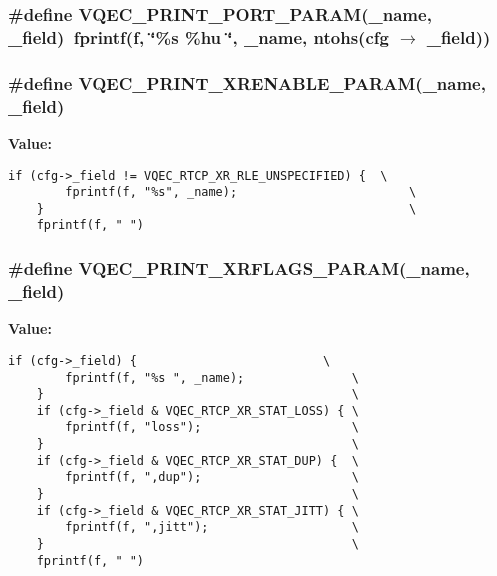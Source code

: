 \subsubsection{\setlength{\rightskip}{0pt plus 5cm}\#define VQEC\_\-PRINT\_\-PORT\_\-PARAM(\_\-name, \_\-field)~fprintf(f, \char`\"{}\%s \%hu \char`\"{}, \_\-name, ntohs(cfg $\rightarrow$ \_\-field))}\label{vqec__cli__register_8c_c55f6a2ce5924e414bb04686df42d132}


\subsubsection{\setlength{\rightskip}{0pt plus 5cm}\#define VQEC\_\-PRINT\_\-XRENABLE\_\-PARAM(\_\-name, \_\-field)}\label{vqec__cli__register_8c_83fce6158202af00181bbe0b949ff2cb}


\textbf{Value:}

\begin{Code}\begin{verbatim}if (cfg->_field != VQEC_RTCP_XR_RLE_UNSPECIFIED) {  \
        fprintf(f, "%s", _name);                        \
    }                                                   \
    fprintf(f, " ")
\end{verbatim}\end{Code}
\subsubsection{\setlength{\rightskip}{0pt plus 5cm}\#define VQEC\_\-PRINT\_\-XRFLAGS\_\-PARAM(\_\-name, \_\-field)}\label{vqec__cli__register_8c_53dbb5bad1a846f9cd6aacea2dc04158}


\textbf{Value:}

\begin{Code}\begin{verbatim}if (cfg->_field) {                          \
        fprintf(f, "%s ", _name);               \
    }                                           \
    if (cfg->_field & VQEC_RTCP_XR_STAT_LOSS) { \
        fprintf(f, "loss");                     \
    }                                           \
    if (cfg->_field & VQEC_RTCP_XR_STAT_DUP) {  \
        fprintf(f, ",dup");                     \
    }                                           \
    if (cfg->_field & VQEC_RTCP_XR_STAT_JITT) { \
        fprintf(f, ",jitt");                    \
    }                                           \
    fprintf(f, " ")
\end{verbatim}\end{Code}
